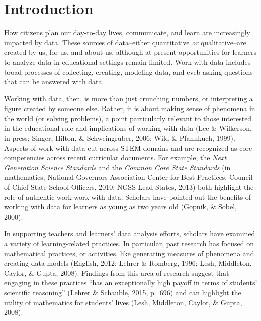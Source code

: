\documentclass[]{msu-thesis}
\theoremstyle{definition}
\theoremstyle{definition}
\theoremstyle{definition}
\theoremstyle{remark}
\begin{document}
\SingleSpacing
\tableofcontents* %
\clearpage
\listoftables %
\clearpage
\listoffigures %
\mainmatter
%

\chapter{Introduction}\label{intro}

\DoubleSpacing

How citizens plan our day-to-day lives, communicate, and learn are
increasingly impacted by data. These sources of data--either
quantitative \emph{or} qualitative--are created by us, for us, and about
us, although at present opportunities for learners to analyze data in
educational settings remain limited. Work with data includes broad
processes of collecting, creating, modeling data, and eveb asking
questions that can be answered with data.

Working with data, then, is more than just crunching numbers, or
interpreting a figure created by someone else. Rather, it is about
making sense of phenomena in the world (or solving problems), a point
particularly relevant to those interested in the educational role and
implications of working with data (Lee \& Wilkerson, in press; Singer,
Hilton, \& Schweingruber, 2006; Wild \& Pfannkuch, 1999). Aspects of
work with data cut across STEM domains and are recognized as core
competencies across recent curricular documents. For example, the
\emph{Next Generation Science Standards} and the \emph{Common Core State
Standards} (in mathematics; National Governors Association Center for
Best Practices, Council of Chief State School Officers, 2010; NGSS Lead
States, 2013) both highlight the role of authentic work work with data.
Scholars have pointed out the benefits of working with data for learners
as young as two years old (Gopnik, \& Sobel, 2000).

In supporting teachers and learners' data analysis efforts, scholars
have examined a variety of learning-related practices. In particular,
past research has focused on mathematical practices, or activities, like
generating measures of phenomena and creating data models (English,
2012; Lehrer \& Romberg, 1996; Lesh, Middleton, Caylor, \& Gupta, 2008).
Findings from this area of research suggest that engaging in these
practices ``has an exceptionally high payoff in terms of students'
scientific reasoning'' (Lehrer \& Schauble, 2015, p.~696) and can
highlight the utility of mathematics for students' lives (Lesh,
Middleton, Caylor, \& Gupta, 2008).
\end{document}
